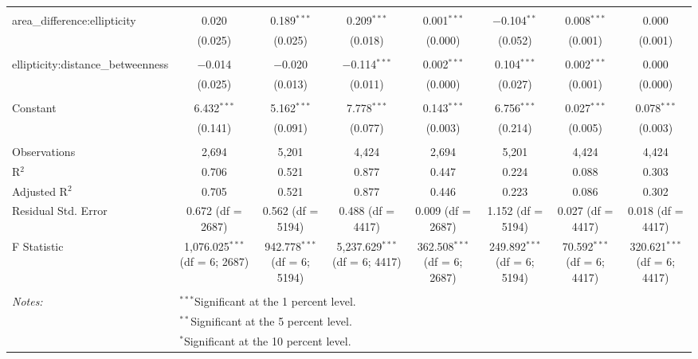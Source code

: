 \begin{table}[!htbp]
\begin{tabular}{@{\extracolsep{5pt}}lccccccc}
  & & & & & & & \\ 
 area\_difference:ellipticity & 0.020 & 0.189$^{***}$ & 0.209$^{***}$ & 0.001$^{***}$ & $-$0.104$^{**}$ & 0.008$^{***}$ & 0.000 \\ 
  & (0.025) & (0.025) & (0.018) & (0.000) & (0.052) & (0.001) & (0.001) \\ 
  & & & & & & & \\ 
 ellipticity:distance\_betweenness & $-$0.014 & $-$0.020 & $-$0.114$^{***}$ & 0.002$^{***}$ & 0.104$^{***}$ & 0.002$^{***}$ & 0.000 \\ 
  & (0.025) & (0.013) & (0.011) & (0.000) & (0.027) & (0.001) & (0.000) \\ 
  & & & & & & & \\ 
 Constant & 6.432$^{***}$ & 5.162$^{***}$ & 7.778$^{***}$ & 0.143$^{***}$ & 6.756$^{***}$ & 0.027$^{***}$ & 0.078$^{***}$ \\ 
  & (0.141) & (0.091) & (0.077) & (0.003) & (0.214) & (0.005) & (0.003) \\ 
  & & & & & & & \\ 
Observations & 2,694 & 5,201 & 4,424 & 2,694 & 5,201 & 4,424 & 4,424 \\ 
R$^{2}$ & 0.706 & 0.521 & 0.877 & 0.447 & 0.224 & 0.088 & 0.303 \\ 
Adjusted R$^{2}$ & 0.705 & 0.521 & 0.877 & 0.446 & 0.223 & 0.086 & 0.302 \\ 
Residual Std. Error & 0.672 (df = 2687) & 0.562 (df = 5194) & 0.488 (df = 4417) & 0.009 (df = 2687) & 1.152 (df = 5194) & 0.027 (df = 4417) & 0.018 (df = 4417) \\ 
F Statistic & 1,076.025$^{***}$ (df = 6; 2687) & 942.778$^{***}$ (df = 6; 5194) & 5,237.629$^{***}$ (df = 6; 4417) & 362.508$^{***}$ (df = 6; 2687) & 249.892$^{***}$ (df = 6; 5194) & 70.592$^{***}$ (df = 6; 4417) & 320.621$^{***}$ (df = 6; 4417) \\ 
\hline \\[-1.8ex] 
\textit{Notes:} & \multicolumn{7}{l}{$^{***}$Significant at the 1 percent level.} \\ 
 & \multicolumn{7}{l}{$^{**}$Significant at the 5 percent level.} \\ 
 & \multicolumn{7}{l}{$^{*}$Significant at the 10 percent level.} \\ 
\end{tabular} 
\end{table} 
